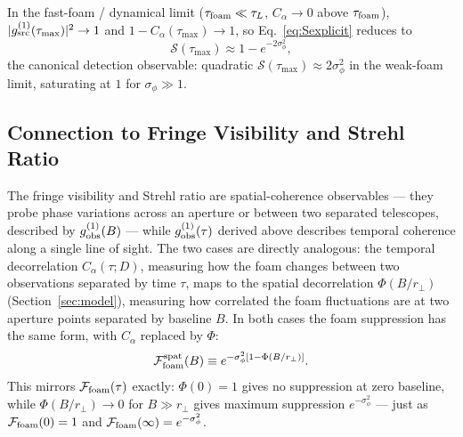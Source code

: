 \documentclass[aps,prd,onecolumn,amsmath,amssymb]{revtex4-2}
\begin{document}
In the fast-foam / dynamical limit
($\tau_{\rm foam}\ll\tau_L$, $C_\alpha\to 0$ above $\tau_{\rm foam}$),
$|g^{(1)}_{\rm src}(\tau_{\max})|^2\to 1$ and $1-C_\alpha(\tau_{\max})\to 1$,
so Eq.~\eqref{eq:Sexplicit} reduces to
\begin{equation}
  \mathcal{S}(\tau_{\max}) \approx 1 - e^{-2\sigma_\phi^2},
  \label{eq:Stc}
\end{equation}
the canonical detection observable: quadratic
$\mathcal{S}(\tau_{\max})\approx 2\sigma_\phi^2$ in the weak-foam limit,
saturating at $1$ for $\sigma_\phi\gg 1$. 

\subsection{Connection to Fringe Visibility and Strehl Ratio}
\label{sec:connection}

The fringe visibility and Strehl ratio are spatial-coherence observables
--- they probe phase variations across an aperture or between two
separated telescopes, described by $g^{(1)}_{\rm obs}(B)$ --- while
$g^{(1)}_{\rm obs}(\tau)$ derived above describes temporal coherence
along a single line of sight. The two cases are directly analogous: the
temporal decorrelation $C_\alpha(\tau;D)$, measuring how the foam changes
between two observations separated by time $\tau$, maps to the spatial
decorrelation $\Phi(B/r_\perp)$ (Section~\ref{sec:model}), measuring how
correlated the foam fluctuations are at two aperture points separated by
baseline $B$. In both cases the foam suppression has the same form, with
$C_\alpha$ replaced by $\Phi$:
\begin{equation}
  \mathcal{F}_{\rm foam}^{\rm spat}(B)
    \equiv e^{-\sigma_\phi^2[1-\Phi(B/r_\perp)]}.
  \label{eq:Ffoam_spat}
\end{equation}
This mirrors $\mathcal{F}_{\rm foam}(\tau)$ exactly: $\Phi(0)=1$ gives no
suppression at zero baseline, while $\Phi(B/r_\perp)\to 0$ for
$B\gg r_\perp$ gives maximum suppression $e^{-\sigma_\phi^2}$ --- just as
$\mathcal{F}_{\rm foam}(0)=1$ and
$\mathcal{F}_{\rm foam}(\infty)=e^{-\sigma_\phi^2}$.
\end{document}
